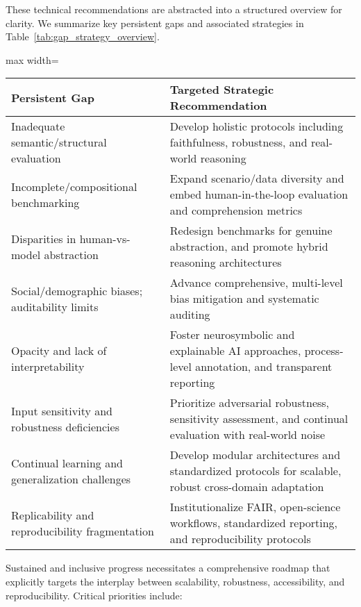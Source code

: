 \documentclass[sigconf]{acmart}
\begin{document}
These technical recommendations are abstracted into a structured overview for clarity. We summarize key persistent gaps and associated strategies in Table~\ref{tab:gap_strategy_overview}.

\begin{table*}[htbp]
\centering
\caption{Mapping of Persistent Gaps to Targeted Strategic Recommendations}
\label{tab:gap_strategy_overview}
\begin{adjustbox}{max width=\textwidth}
\begin{tabular}{ll}
\toprule
\textbf{Persistent Gap} & \textbf{Targeted Strategic Recommendation} \\
\midrule
Inadequate semantic/structural evaluation & Develop holistic protocols including faithfulness, robustness, and real-world reasoning \\
Incomplete/compositional benchmarking & Expand scenario/data diversity and embed human-in-the-loop evaluation and comprehension metrics \\
Disparities in human-vs-model abstraction & Redesign benchmarks for genuine abstraction, and promote hybrid reasoning architectures \\
Social/demographic biases; auditability limits & Advance comprehensive, multi-level bias mitigation and systematic auditing \\
Opacity and lack of interpretability & Foster neurosymbolic and explainable AI approaches, process-level annotation, and transparent reporting \\
Input sensitivity and robustness deficiencies & Prioritize adversarial robustness, sensitivity assessment, and continual evaluation with real-world noise \\
Continual learning and generalization challenges & Develop modular architectures and standardized protocols for scalable, robust cross-domain adaptation \\
Replicability and reproducibility fragmentation & Institutionalize FAIR, open-science workflows, standardized reporting, and reproducibility protocols \\
\bottomrule
\end{tabular}
\end{adjustbox}
\end{table*}

Sustained and inclusive progress necessitates a comprehensive roadmap that explicitly targets the interplay between scalability, robustness, accessibility, and reproducibility. Critical priorities include:
\end{document}
